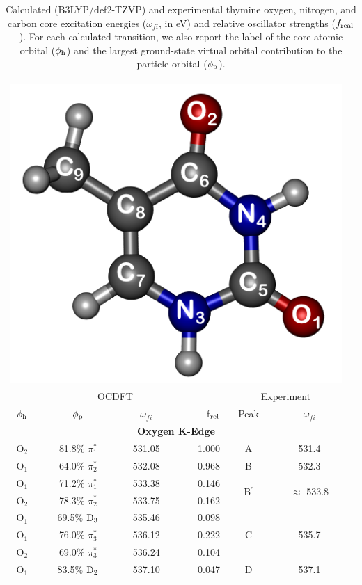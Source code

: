 \documentclass[12pt]{article}
\begin{document}
   \begin{table}[!t]
   \footnotesize
            \caption{Calculated (B3LYP/def2-TZVP) and experimental thymine oxygen, nitrogen, and carbon core excitation energies ($\omega_{fi}$, in eV) and relative oscillator strengths ($f_{\rm real}$).  For each calculated transition, we also report the label of the core atomic orbital ($\phi_{\rm h}$) and the  largest ground-state virtual orbital contribution to the particle orbital ($\phi_{\rm p}$).}
 \centering
     \begin{tabular*}{8.5cm}{@{\extracolsep{\fill} }cccrccc}
     \hline
     \hline\\[-8pt]
     \multicolumn{6}{c}{
 \includegraphics[width=3.cm]{ThymineNumbering.png}
 }\\
 \hline
   \multicolumn{4}{c}{OCDFT} &\multicolumn{2}{c}{Experiment} \\
 $\phi_{\rm h}$ &  $\phi_{\rm p}$ & $\omega_{fi}$ & f$_{\rm rel}$ & Peak &  $\omega_{fi}$   \\[1pt]
   \hline
    \multicolumn{6}{c}{\textbf{Oxygen K-Edge}} \vspace{0.05in}\\
    O$_2$
 &   81.8$\%$ $\pi_1^*$  & 531.05 & 1.000 & A  & 531.4 \vspace{0.05in}\\
    O$_1$
 &   64.0$\%$ $\pi_2^*$  & 532.08 & 0.968 & B & 532.3 \vspace{0.05in}\\
    O$_1$
 &   71.2$\%$ $\pi_1^*$  & 533.38 & 0.146 & \multirow{2}{*}{B$^{\prime}$} & \multirow{2}{*}{$\approx$ 533.8}  \\
    O$_2$
 &   78.3$\%$ $\pi_2^*$  & 533.75 & 0.162 \vspace{0.05in}\\
    O$_1$
 &   69.5$\%$ $\rm D_3$  & 535.46 & 0.098   & \multirow{3}{*}{C} & \multirow{3}{*}{535.7}  \\
    O$_1$
 &   76.0$\%$ $\pi_3^*$  & 536.12 & 0.222 \\
    O$_2$
 &   69.0$\%$ $\pi_3^*$  & 536.24 & 0.104 \vspace{0.05in}\\
    O$_1$
 &   83.5$\%$ $\rm D_2$  & 537.10 & 0.047 & \multirow{3}{*}{D} & \multirow{3}{*}{537.1} \\

\end{tabular*}
\end{table}
\end{document}
